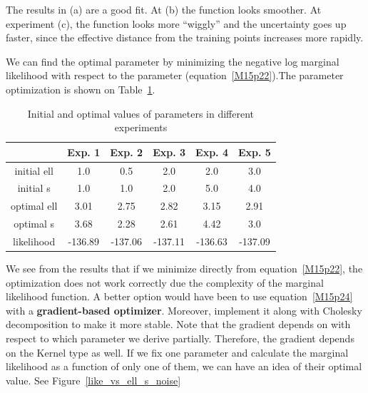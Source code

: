 \documentclass[]{IEEEtran}
\begin{document}
The results in (a) are a good fit. At (b) the function looks smoother. At experiment (c), the function looks more “wiggly” and  the uncertainty goes up faster, since the effective distance from the training points increases more rapidly. \par

We can find the optimal parameter by minimizing the negative log marginal likelihood with respect to the parameter (equation~\ref{M15p22}).The parameter optimization is shown on  Table~\ref{optimization}.

\begin{table}[!h]
\centering
\begin{tabular}{|c|c|c|c|c|c|}
\hline
& Exp. 1&Exp. 2 &Exp. 3& Exp. 4 & Exp. 5\\ \hline
initial ell    & 1.0     & 0.5     & 2.0     & 2.0     & 3.0     \\ \hline
initial  s  & 1.0     & 1.0     & 2.0     & 5.0     & 4.0     \\ \hline
optimal  ell  & 3.01    & 2.75    & 2.82    & 3.15    & 2.91    \\ \hline
optimal  s  & 3.68    & 2.28    & 2.61    & 4.42    & 3.0     \\ \hline
likelihood & -136.89 & -137.06 & -137.11 & -136.63 & -137.09 \\ \hline
\end{tabular}
\caption{Initial and optimal values of parameters in different experiments  }
\label{optimization}
\end{table}\par

We see from the results that if we minimize directly from equation~\ref{M15p22}, the optimization does not work correctly due the complexity of the marginal likelihood function. A better option would have been to use equation~\ref{M15p24}  with a \textbf{gradient-based optimizer}. Moreover, implement it along with Cholesky decomposition to make it more stable. Note that the gradient depends on with respect to which parameter we derive partially. Therefore, the gradient depends on the Kernel type as well.
If we fix one parameter and calculate the marginal likelihood as a function of only one of them, we can have an idea of their optimal value. See Figure~\ref{like_vs_ell_s_noise}
\end{document}
